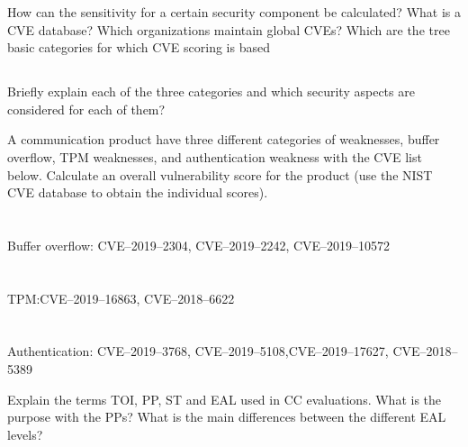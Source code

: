 \begin{questions}
\question{} How can the sensitivity for a certain security component be calculated?
\question{} What is a CVE database? Which organizations maintain global CVEs?
\question{} Which are the tree basic categories for which CVE scoring is based
  \begin{parts}
  \part{} Briefly explain each of the three categories and which security aspects are considered for each of them?
  \end{parts}

\question{} A communication product have three different categories of weaknesses, buffer overflow, TPM weaknesses, and authentication weakness with the CVE list below. Calculate an overall vulnerability score for the product (use the NIST CVE database to obtain the individual scores).
  \begin{parts}
  \part{} Buffer overflow: CVE--2019--2304, CVE--2019--2242, CVE--2019--10572
  \part{} TPM:\@ CVE--2019--16863, CVE--2018--6622
  \part{} Authentication: CVE--2019--3768, CVE--2019--5108,CVE--2019--17627, CVE--2018--5389
  \end{parts}

\question{} Explain the terms TOI, PP, ST and EAL used in CC evaluations.
\question{} What is the purpose with the PPs?
\question{} What is the main differences between the different EAL levels?
\end{questions}

